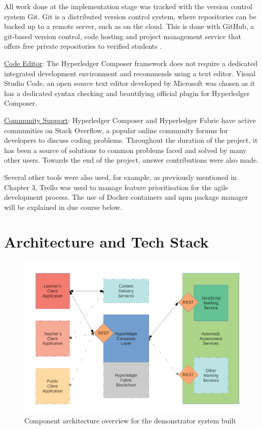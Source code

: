 All work done at the implementation stage was tracked with the version control system Git. 
Git is a distributed version control system, where repositories can be backed up to a remote server, 
such as on the cloud. This is done with GitHub, a git-based version control, code hosting and 
project management service that offers free private repositories to verified students \citep{github2018education}.

\underline{Code Editor}: The Hyperledger Composer framework does not require a dedicated integrated 
development environment and recommends using a text editor. Visual Studio Code, an open source text editor developed 
by Microsoft was chosen as it has a dedicated syntax checking and beautifying official plugin for Hyperledger Composer.

\underline{Community Support}: Hyperledger Composer and Hyperledger Fabric have active communities on Stack Overflow, 
a popular online community forums for developers to discuss coding problems. Throughout the duration of the project, 
it has been a source of solutions to common problems faced and solved by many other users. Towards the end of the project, 
answer contributions were also made.

Several other tools were also used, for example, as previously mentioned in Chapter 3, Trello was used to manage 
feature prioritisation for the agile development process. The use of Docker containers and npm package manager 
will be explained in due course below.

\section{Architecture and Tech Stack}

\begin{figure}[!ht] 
    \centering    
    \includegraphics[width=1.0\textwidth]{architecture}
    \caption[Component architecture overview for the demonstrator system built]
        {Component architecture overview for the demonstrator system built}
    \label{fig:architecture}
\end{figure} 


